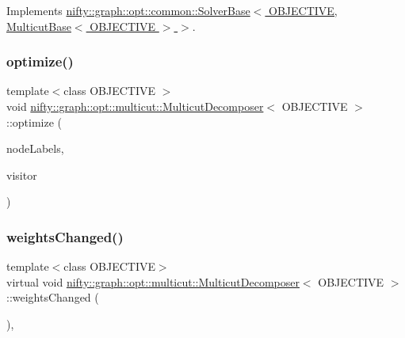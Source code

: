 Implements \hyperlink{classnifty_1_1graph_1_1opt_1_1common_1_1SolverBase_a55e9eb645c07d6e0782ebfb990ab3c84}{nifty\+::graph\+::opt\+::common\+::\+Solver\+Base$<$ O\+B\+J\+E\+C\+T\+I\+V\+E, Multicut\+Base$<$ O\+B\+J\+E\+C\+T\+I\+V\+E $>$ $>$}.

\mbox{\label{classnifty_1_1graph_1_1opt_1_1multicut_1_1MulticutDecomposer_a3af3a6e0f7fb204b4248e0acc4d73548}} 
\subsubsection{\texorpdfstring{optimize()}{optimize()}}
{\footnotesize\ttfamily template$<$class O\+B\+J\+E\+C\+T\+I\+VE $>$ \\
void \hyperlink{classnifty_1_1graph_1_1opt_1_1multicut_1_1MulticutDecomposer}{nifty\+::graph\+::opt\+::multicut\+::\+Multicut\+Decomposer}$<$ O\+B\+J\+E\+C\+T\+I\+VE $>$\+::optimize (\begin{DoxyParamCaption}\item[{\hyperlink{classnifty_1_1graph_1_1opt_1_1multicut_1_1MulticutDecomposer_a69684cd6ab2be276e72622e0fdedca33}{Node\+Labels\+Type} \&}]{node\+Labels,  }\item[{\hyperlink{classnifty_1_1graph_1_1opt_1_1multicut_1_1MulticutDecomposer_aa922f216a5bf815efc8b3926d417ef67}{Visitor\+Base\+Type} $\ast$}]{visitor }\end{DoxyParamCaption})\hspace{0.3cm}{\ttfamily [virtual]}}

\mbox{\label{classnifty_1_1graph_1_1opt_1_1multicut_1_1MulticutDecomposer_a084c96012a6e513417b08f9e4242f6f7}} 
\subsubsection{\texorpdfstring{weights\+Changed()}{weightsChanged()}}
{\footnotesize\ttfamily template$<$class O\+B\+J\+E\+C\+T\+I\+VE$>$ \\
virtual void \hyperlink{classnifty_1_1graph_1_1opt_1_1multicut_1_1MulticutDecomposer}{nifty\+::graph\+::opt\+::multicut\+::\+Multicut\+Decomposer}$<$ O\+B\+J\+E\+C\+T\+I\+VE $>$\+::weights\+Changed (\begin{DoxyParamCaption}{ }\end{DoxyParamCaption})\hspace{0.3cm}{\ttfamily [inline]}, {\ttfamily [virtual]}}




